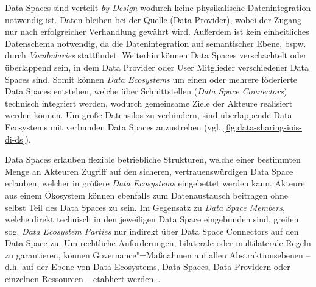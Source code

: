 Data Spaces sind verteilt \emph{by Design} wodurch keine physikalische Datenintegration notwendig ist.
Daten bleiben bei der Quelle (Data Provider), wobei der Zugang nur nach erfolgreicher Verhandlung gewährt wird.
Außerdem ist kein einheitliches Datenschema notwendig, da die Datenintegration auf semantischer Ebene, bspw. durch \emph{Vocabularies} stattfindet.
Weiterhin können Data Spaces verschachtelt oder überlappend sein, in dem Data Provider oder User Mitglieder verschiedener Data Spaces sind.
Somit können \emph{Data Ecosystems} um einen oder mehrere föderierte Data Spaces entstehen, welche über Schnittstellen (\emph{Data Space Connectors}) technisch integriert werden, wodurch gemeinsame Ziele der Akteure realisiert werden können.
Um große Datensilos zu verhindern, sind überlappende Data Ecosystems mit verbunden Data Spaces anzustreben (vgl. \autoref{fig:data-sharing-iois-di-ds}).

Data Spaces erlauben flexible betriebliche Strukturen, welche einer bestimmten Menge an Akteuren Zugriff auf den sicheren, vertrauenswürdigen Data Space erlauben, welcher in größere \emph{Data Ecosystems} eingebettet werden kann.
Akteure aus einem Ökosystem können ebenfalls zum Datenaustausch beitragen ohne selbst Teil des Data Spaces zu sein.
Im Gegensatz zu \emph{Data Space Members}, welche direkt technisch in den jeweiligen Data Space eingebunden sind, greifen sog. \emph{Data Ecosystem Parties} nur indirekt über Data Space Connectors auf den Data Space zu.
Um rechtliche Anforderungen, bilaterale oder multilaterale Regeln zu garantieren, können Governance"=Maßnahmen auf allen Abstraktionsebenen -- d.h. auf der Ebene von Data Ecosystems, Data Spaces, Data Providern oder einzelnen Ressourcen -- etabliert werden~\cite{mollerIndustrialDataEcosystems2024}.
